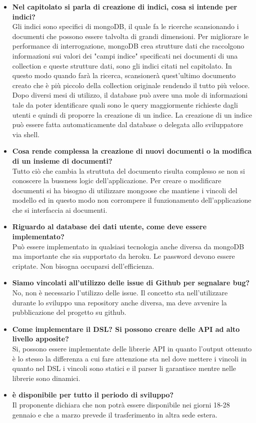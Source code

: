 \begin{itemize}
		\item
		{\bfseries Nel capitolato si parla di creazione di indici, cosa si intende per indici?} \\
		Gli indici sono specifici di mongoDB, il quale fa le ricerche scansionando i documenti che possono essere talvolta di grandi
		dimensioni. Per migliorare le performance di interrogazione, mongoDB crea strutture dati che raccolgono informazioni sui
		valori dei "campi indice" specificati nei documenti di una collection e queste strutture dati, sono gli indici citati nel
		capitolato.
		In questo modo quando farà la ricerca, scansionerà quest'ultimo documento creato che è più piccolo della collection originale
		rendendo il tutto più veloce.	 
		Dopo diversi mesi di utilizzo, il database può avere una mole di informazioni tale da poter identificare quali sono le query
		maggiormente richieste dagli utenti e quindi di proporre la creazione di un indice.
		La creazione di un indice può essere fatta automaticamente dal database o delegata allo sviluppatore via shell.
		
		\item
		{\bfseries Cosa rende complessa la creazione di nuovi documenti o la modifica di un insieme di documenti?} \\
		Tutto ciò che cambia la struttuta del documento risulta complesso se non si conoscere la bussness logic dell'applicazione.
		Per creare o modificare documenti si ha bisogno di utilizzare mongoose che mantiene i vincoli del modello ed in questo modo
		non corrompere il funzionamento dell'applicazione che si interfaccia ai documenti.
		
		\item
		{\bfseries Riguardo al database dei dati utente, come deve essere implementato?} \\
		Può essere implementato in qualsiasi tecnologia anche diversa da mongoDB ma importante che sia supportato da heroku.
		Le password devono essere criptate.
		Non bisogna occuparsi dell'efficienza.
		
		\item
		{\bfseries Siamo vincolati all'utilizzo delle issue di Github per segnalare bug?} \\
		No, non è necessario l'utilizzo delle issue. 
		Il concetto sta nell'utilizzare durante lo sviluppo una repository anche diversa, ma deve avvenire la pubblicazione del
		progetto su github.
		
		\item
		{\bfseries Come implementare il DSL? Si possono creare delle API ad alto livello apposite?} \\
		Si, possono essere implementate delle librerie API in quanto l'output ottenuto è lo stesso la differenza a cui fare
		attenzione sta nel dove mettere i vincoli in quanto nel DSL i vincoli sono statici e il parser li garantisce mentre nelle
		librerie sono dinamici.
		
		\item
		{\bfseries \Proponente{} è disponibile per tutto il periodo di sviluppo?} \\
		Il proponente dichiara che non potrà essere disponibile nei giorni 18-28 gennaio e che a marzo prevede il trasferimento in
		altra sede estera.
				
		
	\end{itemize}